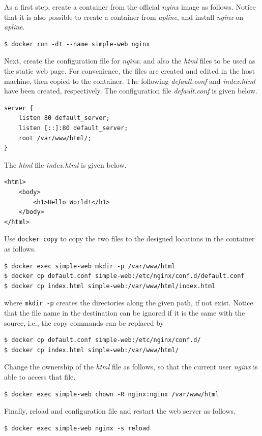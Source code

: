 As a first step, create a container from the official \textit{nginx} image as follows. Notice that it is also possible to create a container from \textit{apline}, and install \textit{nginx} on \textit{apline}.
\begin{lstlisting}
$ docker run -dt --name simple-web nginx
\end{lstlisting}

Next, create the configuration file for \textit{nginx}, and also the \textit{html} files to be used as the static web page. For convenience, the files are created and edited in the host machine, then copied to the container. The following \textit{default.conf} and \textit{index.html} have been created, respectively. The configuration file \textit{default.conf} is given below.
\begin{lstlisting}
server {
	listen 80 default_server;
	listen [::]:80 default_server;
	root /var/www/html/;
}
\end{lstlisting}
The \textit{html} file \textit{index.html} is given below.
\begin{lstlisting}
<html>
	<body>
		<h1>Hello World!</h1>
	</body>
</html>
\end{lstlisting}
Use \verb|docker copy| to copy the two files to the designed locations in the container as follows.
\begin{lstlisting}
$ docker exec simple-web mkdir -p /var/www/html
$ docker cp default.conf simple-web:/etc/nginx/conf.d/default.conf
$ docker cp index.html simple-web:/var/www/html/index.html
\end{lstlisting}
where \verb|mkdir -p| creates the directories along the given path, if not exist. Notice that the file name in the destination can be ignored if it is the same with the source, i.e., the copy commands can be replaced by
\begin{lstlisting}
$ docker cp default.conf simple-web:/etc/nginx/conf.d/
$ docker cp index.html simple-web:/var/www/html/
\end{lstlisting}

Change the ownership of the \textit{html} file as follows, so that the current user \textit{nginx} is able to access that file.
\begin{lstlisting}
$ docker exec simple-web chown -R nginx:nginx /var/www/html
\end{lstlisting}

Finally, reload and configuration file and restart the web server as follows.
\begin{lstlisting}
$ docker exec simple-web nginx -s reload
\end{lstlisting}

